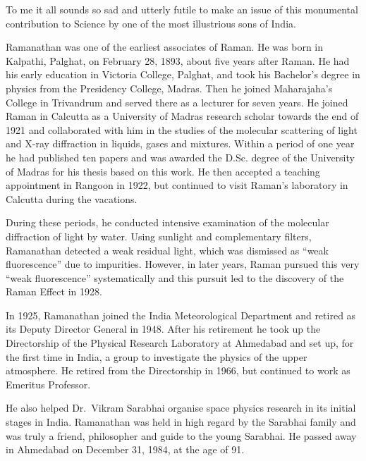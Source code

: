 To me it all sounds so sad and utterly futile to make an issue of this monumental contribution to Science by one of the most illustrious sons of India.

\medskip
{}
\smallskip


\noindent
Ramanathan was one of the earliest associates of Raman. He was born in Kalpathi, Palghat, on February 28, 1893, about five years after Raman. He had his early education in Victoria College, Palghat, and took his Bachelor's degree in physics from the Presidency College, Madras. Then he joined Maharajaha's College in Trivandrum and served there as a lecturer for seven years. He joined Raman in Calcutta as a University of Madras research scholar towards the end of 1921 and collaborated with him in the studies of the molecular scattering of light and X-ray diffraction in liquids, gases and mixtures. Within a period of one year he had published ten papers and was awarded the D.Sc. degree of the University of Madras for his thesis based on this work. He then accepted a teaching appointment in Rangoon in 1922, but continued to visit Raman's laboratory in Calcutta during the vacations.

During these periods, he conducted intensive examination of the molecular diffraction of light by water. Using sunlight and complementary filters, Ramanathan detected a weak residual light, which was dismissed as ``weak fluorescence'' due to impurities. However, in later years, Raman pursued this very ``weak fluorescence'' systematically and this pursuit led to the discovery of the Raman Effect in 1928.

In 1925, Ramanathan joined the India Meteorological Department and retired as its Deputy Director General in 1948. After his retirement he took up the Directorship of the Physical Research Laboratory at Ahmedabad and set up, for the first time in India, a group to investigate the physics of the upper
atmosphere. He retired from the Directorship in 1966, but continued to work as Emeritus Professor.

He also helped Dr.~Vikram Sarabhai organise space physics research in its initial stages in India. Ramanathan was held in high regard by the Sarabhai family and was truly a friend, philosopher and guide to the young Sarabhai. He passed away in Ahmedabad on December 31, 1984, at the age of 91.

